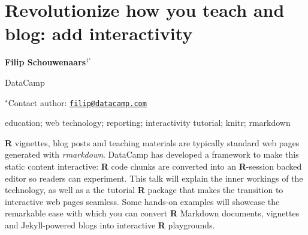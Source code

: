 \documentclass[\main/boa.tex]{subfiles}
\begin{document}
\pagestyle{empty}

\section{Revolutionize how you teach and blog: add interactivity}

\begin{center}
  {\bf Filip Schouwenaars$^{1^\star}$}
\end{center}

\vskip 0.3cm

\begin{affiliations}
\begin{enumerate}
\begin{minipage}{0.915\textwidth}
\centering
\item DataCamp \\[-2pt]
\end{minipage}
\end{enumerate}
$^\star$Contact author: \href{mailto:filip@datacamp.com}{\nolinkurl{filip@datacamp.com}}\\
\end{affiliations}

\vskip 0.5cm

\begin{minipage}{0.915\textwidth}
\keywords education; web technology; reporting; interactivity
\packages tutorial; knitr; rmarkdown
\end{minipage}

\vskip 0.8cm

\textbf{R} vignettes, blog posts and teaching materials are typically
standard web pages generated with \emph{rmarkdown}. DataCamp has
developed a framework to make this static content interactive:
\textbf{R} code chunks are converted into an \textbf{R}-session backed
editor so readers can experiment. This talk will explain the inner
workings of the technology, as well as a the tutorial \textbf{R} package
that makes the transition to interactive web pages seamless. Some
hands-on examples will showcase the remarkable ease with which you can
convert \textbf{R} Markdown documents, vignettes and Jekyll-powered
blogs into interactive \textbf{R} playgrounds.
\end{document}

